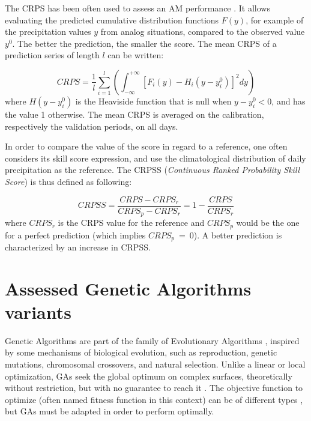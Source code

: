 \documentclass{ametsoc}
\begin{document}
The CRPS \citep[Continuous Ranked Probability Score,][]{Brown1974, Matheson1976, Hersbach2000} has been often used to assess an AM performance \citep[see, e.g.,][]{Bontron2004, Bontron2005, BenDaoud2008, Horton2012, Marty2012, Radanovics2013, Chardon2014, Junk2015, BenDaoud2016, Caillouet2016}. It allows evaluating the predicted cumulative distribution functions $F(y)$, for example of the precipitation values $y$ from analog situations, compared to the observed value $y^{0}$. The better the prediction, the smaller the score. The mean CRPS of a prediction series of length $l$ can be written:

\begin{equation}
\label{eq:CRPS}
CRPS = \frac{1}{l} \sum_{i=1}^{l} \left(  \int_{-\infty}^{+\infty} \left[ F_{i}(y)-H_{i}(y-y_{i}^{0})\right]^{2} dy \right) 
\end{equation}
where $H(y-y_{i}^{0})$ is the Heaviside function that is null when $y-y_{i}^{0}<0$, and has the value 1 otherwise. The mean CRPS is averaged on the calibration, respectively the validation periods, on all days.

In order to compare the value of the score in regard to a reference, one often considers its skill score expression, and use the climatological distribution of daily precipitation as the reference. The CRPSS (\textit{Continuous Ranked Probability Skill Score}) is thus defined as following:

\begin{equation}
\label{eq:CRPSS}
CRPSS = \frac{CRPS-CRPS_{r}}{CRPS_{p}-CRPS_{r}} = 1-\frac{CRPS}{CRPS_{r}}
\end{equation}
where $CRPS_{r}$ is the CRPS value for the reference and $CRPS_{p}$ would be the one for a perfect prediction (which implies $CRPS_{p}~=~0$). A better prediction is characterized by an increase in CRPSS.


\section{Assessed Genetic Algorithms variants}
\label{sec:gas}

Genetic Algorithms \citep[GAs,][]{Holland1992b, Goldberg1989} are part of the family of Evolutionary Algorithms \citep{Back1993b, Schwefel1993}, inspired by some mechanisms of biological evolution, such as reproduction, genetic mutations, chromosomal crossovers, and natural selection. Unlike a linear or local optimization, GAs seek the global optimum on complex surfaces, theoretically without restriction, but with no guarantee to reach it \citep{Haupt2004}. The objective function to optimize (often named fitness function in this context) can be of different types \citep{Joines1996a}, but GAs must be adapted in order to perform optimally.
\end{document}
